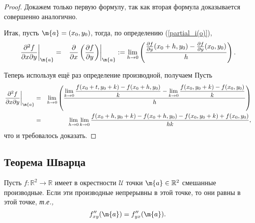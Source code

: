 \begin{proof}
Докажем только первую формулу, так как вторая формула доказывается совершенно аналогично. 

Итак, пусть $\m{a} = (x_0,y_0)$, тогда, по определению (\ref{partial_i(o)}), 
\begin{eqnarray*}
       \left. \frac{\partial^2 f}{\partial x \partial y}\right|_\m{a} &=& \left. \frac{\partial}{\partial x}\left( \frac{\partial f}{\partial y} \right) \right|_\m{a} := \lim_{h \to 0} \left( \frac{\frac{\partial f}{\partial y}(x_0+h, y_0) - \frac{\partial f}{\partial y}(x_0,y_0)  }{h}  \right).
\end{eqnarray*}

Теперь используя ещё раз определение производной, получаем
Пусть  
    \begin{eqnarray*}
       \left. \frac{\partial^2 f}{\partial x \partial y}\right|_\m{a}
       &=& \lim_{h \to 0}\left( \frac{ \lim\limits_{k\to 0} \dfrac{f(x_0+t, y_0 +k) -f(x_0+h,y_0)}{k}  - \lim\limits_{k\to 0} \dfrac{f(x_0,y_0+k) -f(x_0,y_0)}{k} } {h}  \right) \\
       &=& \lim_{h\to 0} \lim_{k \to 0} \dfrac{f(x_0+h, y_0 +k) -f(x_0+h,y_0) - f(x_0,y_0+k) +f(x_0,y_0)}{hk},
    \end{eqnarray*}
    что и требовалось доказать.
\end{proof}


\subsection{Теорема Шварца}


\begin{theorem}[\bf Шварц]
    Пусть $f:\mathbb{R}^2 \to \mathbb{R}$ имеет в окрестности $\mathscr{U}$ точки $\m{a} \in \mathbb{R}^2$ смешанные производные. Если эти производные непрерывны в этой точке, то они равны в этой точке, \textit{т.е.,}
    \[f''_{xy}(\m{a}) = f''_{yx}(\m{a}).
    \]
\end{theorem}

